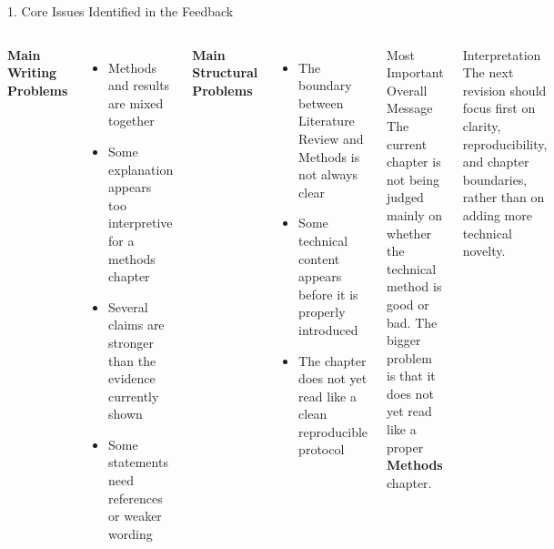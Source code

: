 \documentclass[aspectratio=169, 11pt]{beamer}
\begin{document}
\begin{frame}[shrink=7]{1. Core Issues Identified in the Feedback}

    \begin{columns}[T]
        \textbf{Main Writing Problems}
        \begin{itemize}
            \item Methods and results are mixed together
            \item Some explanation appears too interpretive for a methods chapter
            \item Several claims are stronger than the evidence currently shown
            \item Some statements need references or weaker wording
        \end{itemize}

        \vspace{2mm}
        \textbf{Main Structural Problems}
        \begin{itemize}
            \item The boundary between Literature Review and Methods is not always clear
            \item Some technical content appears before it is properly introduced
            \item The chapter does not yet read like a clean reproducible protocol
        \end{itemize}

        \begin{alertblock}{Most Important Overall Message}
            The current chapter is not being judged mainly on whether the technical method is good or bad. The bigger problem is that it does not yet read like a proper \textbf{Methods} chapter.
        \end{alertblock}

        \vspace{2mm}
        \begin{exampleblock}{Interpretation}
            The next revision should focus first on clarity, reproducibility, and chapter boundaries, rather than on adding more technical novelty.
        \end{exampleblock}
    \end{columns}
\end{frame}
\end{document}
